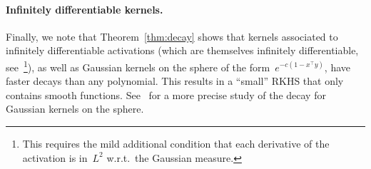 \paragraph{Infinitely differentiable kernels.}
Finally, we note that Theorem~\ref{thm:decay} shows that kernels associated to infinitely differentiable activations (which are themselves infinitely differentiable, see~\citet{daniely2016toward}\footnote{This requires the mild additional condition that each derivative of the activation is in~$L^2$ w.r.t.~the Gaussian measure.}), as well as Gaussian kernels on the sphere of the form~$e^{-c(1-x^\top y)}$, have faster decays than any polynomial. This results in a ``small'' RKHS that only contains smooth functions.
See~\citet{azevedo2014sharp,minh2006mercer} for a more precise study of the decay for Gaussian kernels on the sphere.
